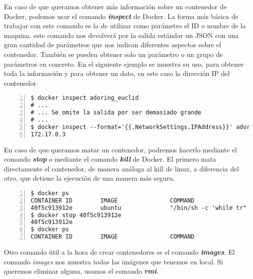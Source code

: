 	En caso de que queramos obtener más información sobre un contenedor de Docker, podemos usar el comando \textbf{\emph{inspect}} de Docker. La forma más básica de trabajar con este comando es la de utilizar como parámetro el ID o nombre de la maquina. este comando nos devolverá por la salida estándar un JSON con una gran cantidad de parámetros que nos indican diferentes aspectos sobre el contenedor. También se pueden obtener solo un parámetro o un grupo de parámetros en concreto. En el siguiente ejemplo se muestra su uso, para obtener toda la información y para obtener un dato, en este caso la dirección IP del contenedor.
	
	\begin{lstlisting}[style=consola,numbers=left]
$ docker inspect adoring_euclid
# ...
# ... Se omite la salida por ser demasiado grande
# ...
$ docker inspect --format='{{.NetworkSettings.IPAddress}}' adoring_euclid
172.17.0.3
	\end{lstlisting}

	En caso de que queramos matar un contenedor, podremos hacerlo mediante el comando \textbf{\emph{stop}} o mediante el comando \textbf{\emph{kill}} de Docker. El primero mata directamente el contenedor, de manera análoga al kill de linux, a diferencia del otro, que detiene la ejecución de una manera más segura.
	
	\begin{lstlisting}[style=consola,numbers=left]
$ docker ps
CONTAINER ID        IMAGE               COMMAND                  CREATED             STATUS              PORTS               NAMES
40f5c913912e        ubuntu              "/bin/sh -c 'while tr"   2 seconds ago       Up 2 seconds                            adoring_euclid
$ docker stop 40f5c913912e
40f5c913912e
$ docker ps
CONTAINER ID        IMAGE               COMMAND                  CREATED             STATUS              PORTS               NAMES

	\end{lstlisting}
	
	Otro comando útil a la hora de crear contenedores es el comando \textbf{\emph{images}}. El comando \textit{images} nos muestra todas las imágenes que tenemos en local. Si queremos eliminar alguna, usamos el comando \textbf{\emph{rmi}}.
	
